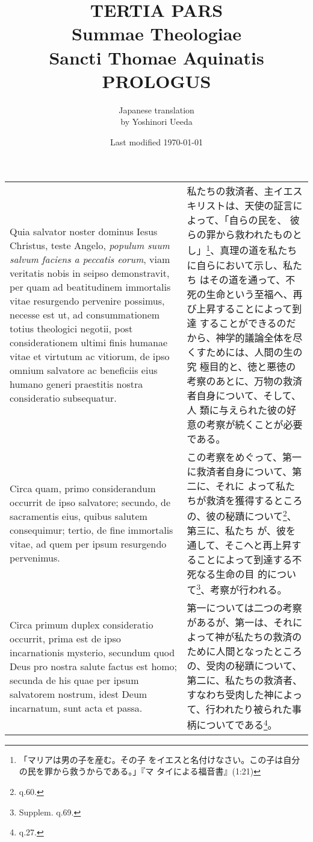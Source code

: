 \documentclass[10pt]{jsarticle} %
\title{{\bf TERTIA PARS}\\{\HUGE Summae Theologiae}\\Sancti Thomae
Aquinatis\\{\sffamily PROLOGUS}}
\author{Japanese translation\\by Yoshinori {\sc Ueeda}}
\date{Last modified \today}
\begin{document}
\maketitle
\pagestyle{fancy}


\begin{longtable}{p{21em}p{21em}}
Quia salvator noster dominus Iesus Christus, teste Angelo, {\it populum
suum salvum faciens a peccatis eorum}, viam veritatis nobis in seipso
demonstravit, per quam ad beatitudinem immortalis vitae resurgendo
pervenire possimus, necesse est ut, ad consummationem totius theologici
negotii, post considerationem ultimi finis humanae vitae et virtutum ac
vitiorum, de ipso omnium salvatore ac beneficiis eius humano generi
praestitis nostra consideratio subsequatur. 


&


私たちの救済者、主イエスキリストは、天使の証言によって、「自らの民を、
彼らの罪から救われたものとし」\footnote{「マリアは男の子を産む。その子
をイエスと名付けなさい。この子は自分の民を罪から救うからである。」『マ
タイによる福音書』(1:21)}、真理の道を私たちに自らにおいて示し、私たち
はその道を通って、不死の生命という至福へ、再び上昇することによって到達
することができるのだから、神学的議論全体を尽くすためには、人間の生の究
極目的と、徳と悪徳の考察のあとに、万物の救済者自身について、そして、人
類に与えられた彼の好意の考察が続くことが必要である。


\\

Circa quam, primo
considerandum occurrit de ipso salvatore; secundo, de sacramentis eius,
quibus salutem consequimur; tertio, de fine immortalis vitae, ad quem
per ipsum resurgendo pervenimus. 


&


この考察をめぐって、第一に救済者自身について、第二に、それに
 よって私たちが救済を獲得するところの、彼の秘蹟について\footnote{q.60.}、第三に、私たち
 が、彼を通して、そこへと再上昇することによって到達する不死なる生命の目
 的について\footnote{Supplem. q.69.}、考察が行われる。



\\


Circa primum duplex consideratio
occurrit, prima est de ipso incarnationis mysterio, secundum quod Deus
pro nostra salute factus est homo; secunda de his quae per ipsum
salvatorem nostrum, idest Deum incarnatum, sunt acta et passa.

&


第一については二つの考察があるが、第一は、それによって神が私たちの救済の
 ために人間となったところの、受肉の秘蹟について、第二に、私たちの救済者、
 すなわち受肉した神によって、行われたり被られた事柄についてである\footnote{q.27.}。

\end{longtable}
\end{document}
